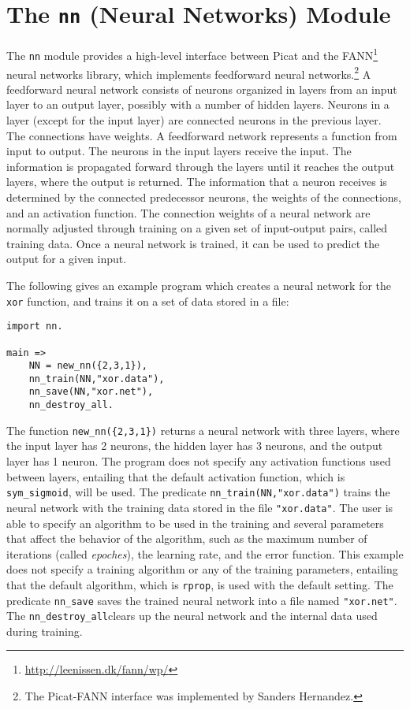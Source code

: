 
\chapter{\label{chapter:nn}The \texttt{nn} (Neural Networks) Module}

The \texttt{nn} module provides a high-level interface between Picat and the FANN\footnote{\url{http://leenissen.dk/fann/wp/}} neural networks library, which implements feedforward neural networks.\footnote{The Picat-FANN interface was implemented by Sanders Hernandez.}  A feedforward neural network consists of neurons organized in layers from an input layer to an output layer, possibly with a number of hidden layers. Neurons in a layer (except for the input layer) are connected neurons in the previous layer. The connections have weights. A feedforward network represents a function from input to output. The neurons in the input layers receive the input. The information is propagated forward through the layers until it reaches the output layers, where the output is returned. The information that a neuron receives is determined by the connected predecessor neurons, the weights of the connections, and an activation function. The connection weights of a neural network are normally adjusted through training on a given set of input-output pairs, called training data. Once a neural network is trained, it can be used to predict the output for a given input.

The following gives an example program which creates a neural network for the \texttt{xor} function,  and trains it on a set of data stored in a file:
\begin{verbatim}
import nn.

main =>
    NN = new_nn({2,3,1}),
    nn_train(NN,"xor.data"),
    nn_save(NN,"xor.net"),
    nn_destroy_all.
\end{verbatim}
The function \texttt{new\_nn(\{2,3,1\})} returns a neural network with three layers, where the input layer has 2 neurons, the hidden layer has 3 neurons, and the output layer has 1 neuron. The program does not specify any activation functions used between layers, entailing that the default activation function, which is \texttt{sym\_sigmoid}, will be used. The predicate \texttt{nn\_train(NN,"xor.data")} trains the neural network with the training data stored in the file \texttt{"xor.data"}. The user is able to specify an algorithm to be used in the training and several parameters that affect the behavior of the algorithm, such as the maximum number of iterations (called \textit{epoches}), the learning rate, and the error function. This example does not specify a training algorithm or any of the training parameters, entailing that the default algorithm, which is \texttt{rprop}, is used with the default setting. The predicate \texttt{nn\_save} saves the trained neural network into a file named \texttt{"xor.net"}. The \texttt{nn\_destroy\_all}clears up the neural network and the internal data used during training.

